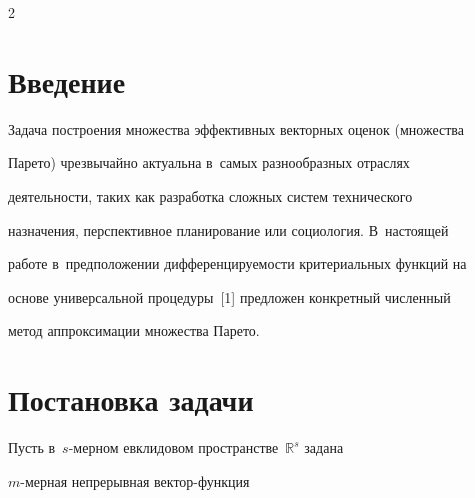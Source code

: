 \begin{multicols}{2}





\label{st\stat}





\section{Введение}





\vspace*{-3pt}





  Задача построения множества эффективных векторных оценок (множества 


Парето) чрезвычайно актуальна в~самых разнообразных отраслях 


деятельности, таких как разработка сложных сис\-тем технического 


назначения, перспективное планирование или социология. В~настоящей 


работе в~предположении дифференцируемости критериальных функций на 


основе универсальной процедуры~[1] предложен конкретный численный 


метод аппроксимации множества Парето.





\vspace*{-9pt}


  


\section{Постановка задачи}





\vspace*{-3pt}





  Пусть в~$s$-мерном евклидовом пространстве~$\mathbb{R}^s$ задана 


  $m$-мер\-ная непрерывная век\-тор-функ\-ция


  \begin{equation}



\end{equation}
\end{multicols}
